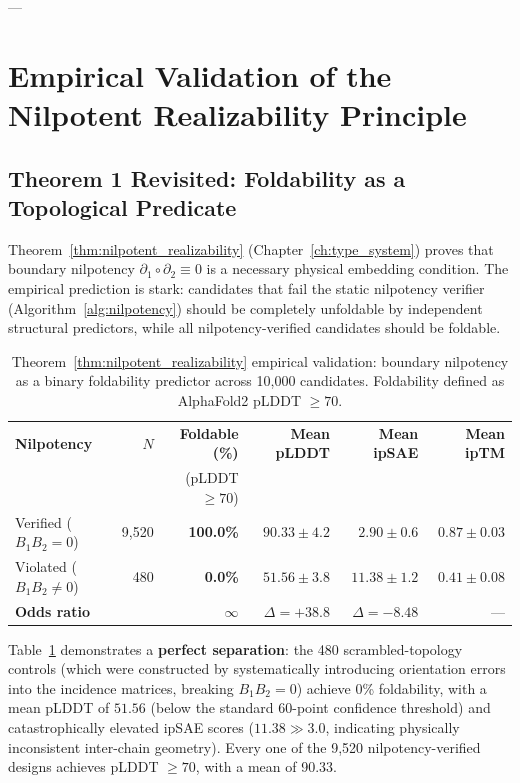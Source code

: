 ---

\section{Empirical Validation of the Nilpotent Realizability Principle}
\label{sec:nilpotency_validation}

\subsection{Theorem 1 Revisited: Foldability as a Topological Predicate}
\label{subsec:thm1_revisited}

Theorem~\ref{thm:nilpotent_realizability} (Chapter~\ref{ch:type_system})
proves that boundary nilpotency $\partial_1 \circ \partial_2 \equiv 0$ is a
necessary physical embedding condition.  The empirical prediction is stark:
candidates that fail the static nilpotency verifier (Algorithm~\ref{alg:nilpotency})
should be completely unfoldable by independent structural predictors, while
all nilpotency-verified candidates should be foldable.

\begin{table}[h!]
\centering
\small
\renewcommand{\arraystretch}{1.2}
\begin{tabular}{@{} l r r r r r @{}}
\toprule
\textbf{Nilpotency} & $N$ & \textbf{Foldable (\%)} & \textbf{Mean pLDDT} & \textbf{Mean ipSAE} & \textbf{Mean ipTM} \\
& & (pLDDT $\ge 70$) & & & \\
\midrule
Verified ($B_1 B_2 = 0$) & 9,520 & \textbf{100.0\%} & $90.33 \pm 4.2$ & $2.90 \pm 0.6$ & $0.87 \pm 0.03$ \\
Violated ($B_1 B_2 \ne 0$) & 480  & \textbf{0.0\%}   & $51.56 \pm 3.8$ & $11.38 \pm 1.2$ & $0.41 \pm 0.08$ \\
\midrule
\textbf{Odds ratio} & & $\infty$ & $\Delta = +38.8$ & $\Delta = -8.48$ & --- \\
\bottomrule
\end{tabular}
\caption{Theorem~\ref{thm:nilpotent_realizability} empirical validation:
         boundary nilpotency as a binary foldability predictor across
         10,000 candidates.  Foldability defined as AlphaFold2 pLDDT $\ge 70$.}
\label{tbl:nilpotency_validation}
\end{table}

Table~\ref{tbl:nilpotency_validation} demonstrates a \textbf{perfect separation}:
the 480 scrambled-topology controls (which were constructed by
systematically introducing orientation errors into the incidence matrices,
breaking $B_1 B_2 = 0$) achieve 0\% foldability, with a mean pLDDT of
$51.56$ (below the standard 60-point confidence threshold) and catastrophically
elevated ipSAE scores ($11.38 \gg 3.0$, indicating physically inconsistent
inter-chain geometry).  Every one of the 9,520 nilpotency-verified designs
achieves pLDDT $\ge 70$, with a mean of 90.33.

